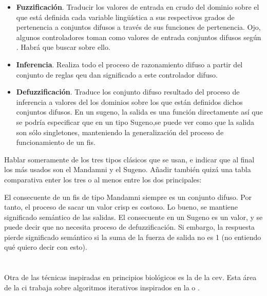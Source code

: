 \begin{itemize}
	\item \textbf{Fuzzificación}. Traducir los valores de entrada en crudo del dominio sobre el que está definida cada variable lingüística a sus respectivos grados de pertenencia a conjuntos difusos a través de sus funciones de pertenencia. \TODO Ojo, algunos controladores toman como valores de entrada conjuntos difusos según \cite{Ma2004}. Habrá que buscar sobre ello.
	\item \textbf{Inferencia}. Realiza todo el proceso de razonamiento difuso a partir del conjunto de reglas qeu dan significado a este controlador difuso.
	\item \textbf{Defuzzificación}. Traduce los conjunto difuso resultado del proceso de inferencia a valores del los dominios sobre los que están definidos dichos conjuntos difusos. \TODO En un sugeno, la salida es una función directamente así que se podría especificar que en un tipo Sugeno,se puede ver como que la salida son sólo singletones, manteniendo la generalización del proceso de funcionamiento de un \ac{fis}.
\end{itemize}

Hablar someramente de los tres tipos clásicos que se usan, e indicar que al final los más usados son el Mandamni y el Sugeno. Añadir también quizá una tabla comparativa enter los tres o al menos entre los dos principales:

El consecuente de un \ac{fis} de tipo Mandamni siempre es un conjunto difuso. Por tanto, el proceso de sacar un valor crisp es costoso. Lo bueno, se mantiene significado semántico de las salidas. El consecuente en un Sugeno es un valor, y se puede decir que no necesita proceso de defuzzificación. Si embargo, la respuesta pierde significado semántico si la suma de la fuerza de salida no es 1 (no entiendo qué quiero decir con esto).

\section{}

Otra de las técnicas inspiradas en principios biológicos es la de la \gls{cev}. Esta área de la \gls{ci} trabaja sobre algoritmos iterativos inspirados en la  o .

